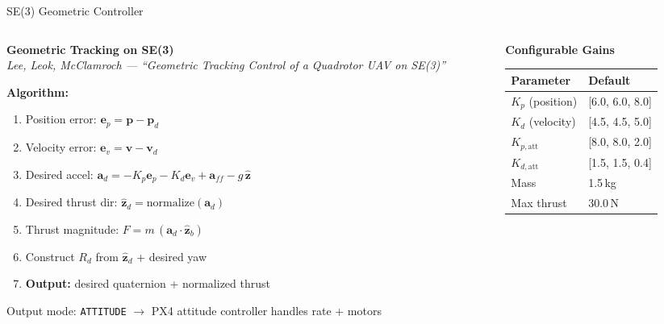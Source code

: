 \documentclass[aspectratio=169, 10pt]{beamer}
\begin{document}
\begin{frame}{SE(3) Geometric Controller}
\begin{columns}[T]
\begin{column}{0.55\textwidth}
\textbf{Geometric Tracking on SE(3)}\\
{\scriptsize\itshape Lee, Leok, McClamroch --- ``Geometric Tracking Control of a Quadrotor UAV on SE(3)''}

\vspace{0.5em}
\small
\textbf{Algorithm:}
\begin{enumerate}\small
  \item Position error: $\mathbf{e}_p = \mathbf{p} - \mathbf{p}_d$
  \item Velocity error: $\mathbf{e}_v = \mathbf{v} - \mathbf{v}_d$
  \item Desired accel: $\mathbf{a}_d = -K_p \mathbf{e}_p - K_d \mathbf{e}_v + \mathbf{a}_{ff} - g\,\hat{\mathbf{z}}$
  \item Desired thrust dir: $\hat{\mathbf{z}}_d = \text{normalize}(\mathbf{a}_d)$
  \item Thrust magnitude: $F = m\,(\mathbf{a}_d \cdot \hat{\mathbf{z}}_b)$
  \item Construct $R_d$ from $\hat{\mathbf{z}}_d$ + desired yaw
  \item \textbf{Output:} desired quaternion + normalized thrust
\end{enumerate}

\vspace{0.3em}
Output mode: \texttt{ATTITUDE} $\to$ PX4 attitude controller handles rate + motors
\end{column}

\begin{column}{0.42\textwidth}
\textbf{Configurable Gains}

\vspace{0.3em}
\small
\begin{tabular}{@{}ll@{}}
\toprule
\textbf{Parameter} & \textbf{Default} \\
\midrule
$K_p$ (position) & [6.0, 6.0, 8.0] \\
$K_d$ (velocity) & [4.5, 4.5, 5.0] \\
$K_{p,\text{att}}$ & [8.0, 8.0, 2.0] \\
$K_{d,\text{att}}$ & [1.5, 1.5, 0.4] \\
Mass & 1.5\,kg \\
Max thrust & 30.0\,N \\
\bottomrule
\end{tabular}


\end{column}
\end{columns}
\end{frame}
\end{document}
